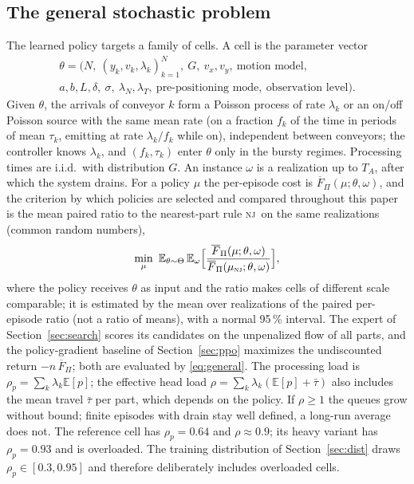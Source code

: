 \documentclass[11pt,a4paper]{article}
\theoremstyle{plain}
\theoremstyle{definition}
\theoremstyle{remark}
\newcommand{\nj}{\textsc{nj}}
\newcommand{\Fpi}{\overline F_\Pi}
\begin{document}
\subsection{The general stochastic problem}\label{sec:general}
The learned policy targets a family of cells. A cell is the parameter vector
\begin{multline*}
\theta=\bigl(N,\ (y_k,v_k,\lambda_k)_{k=1}^N,\ G,\ v_x,v_y,\ \text{motion model},\\
a,b,L,\delta,\ \sigma,\ \lambda_N,\lambda_T,\ \text{pre-positioning mode},\ \text{observation level}\bigr).
\end{multline*}
Given $\theta$, the arrivals of conveyor $k$ form a Poisson process of rate $\lambda_k$ or
an on/off Poisson source with the same mean rate (on a fraction $f_k$ of the time in
periods of mean $\tau_k$, emitting at rate $\lambda_k/f_k$ while on), independent between
conveyors; the controller knows $\lambda_k$, and $(f_k,\tau_k)$ enter $\theta$ only in the
bursty regimes. Processing times are i.i.d.\ with distribution $G$. An instance $\omega$
is a realization up to $T_A$, after which the system drains. For a policy $\mu$ the
per-episode cost is $\Fpi(\mu;\theta,\omega)$, and the criterion by which policies are
selected and compared throughout this paper is the mean paired ratio to the nearest-part
rule \nj\ on the same realizations (common random numbers),
\begin{equation}\label{eq:general}
\min_\mu\ \mathbb E_{\theta\sim\Theta}\,\mathbb E_\omega\Bigl[\frac{\Fpi(\mu;\theta,\omega)}{\Fpi(\mu_{\nj};\theta,\omega)}\Bigr],
\end{equation}
where the policy receives $\theta$ as input and the ratio makes cells of different scale
comparable; it is estimated by the mean over realizations of the paired per-episode
ratio (not a ratio of means), with a normal 95\,\% interval. The expert of
Section~\ref{sec:search} scores its candidates on the unpenalized flow of all parts, and
the policy-gradient baseline of Section~\ref{sec:ppo} maximizes the undiscounted return
$-n\,\Fpi$; both are evaluated by \eqref{eq:general}. The processing load is
$\rho_p=\sum_k\lambda_k\mathbb E[p]$; the effective
head load $\rho=\sum_k\lambda_k(\mathbb E[p]+\bar\tau)$ also includes the mean travel
$\bar\tau$ per part, which depends on the policy. If $\rho\ge1$ the queues grow without
bound; finite episodes with drain stay well defined, a long-run average does not. The
reference cell has $\rho_p=0.64$ and $\rho\approx0.9$; its heavy variant has $\rho_p=0.93$
and is overloaded. The training distribution of Section~\ref{sec:dist} draws
$\rho_p\in[0.3,0.95]$ and therefore deliberately includes overloaded cells.
\end{document}
